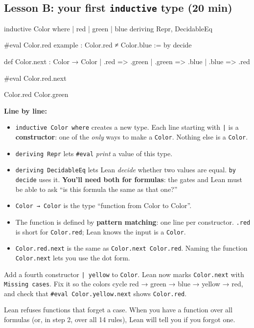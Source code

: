 \documentclass[11pt,a4paper]{article}
\newcommand{\code}[1]{\texttt{#1}}
\begin{document}
\subsection{Lesson B: your first \texttt{inductive} type (20 min)}
\begin{lean}
inductive Color where
  | red
  | green
  | blue
  deriving Repr, DecidableEq

#eval Color.red
example : Color.red ≠ Color.blue := by decide

def Color.next : Color → Color
  | .red   => .green
  | .green => .blue
  | .blue  => .red

#eval Color.red.next
\end{lean}
\begin{output}
Color.red
Color.green
\end{output}
\textbf{Line by line:}
\begin{itemize}
\item \code{inductive Color where} creates a new type. Each line starting with \code{|} is a \textbf{constructor}: one of the \emph{only} ways to make a \code{Color}. Nothing else is a \code{Color}.
\item \code{deriving Repr} lets \code{\#eval} \emph{print} a value of this type.
\item \code{deriving DecidableEq} lets Lean \emph{decide} whether two values are equal. \code{by decide} uses it. \textbf{You'll need both for formulas}: the gates and Lean must be able to ask ``is this formula the same as that one?''
\item \code{Color → Color} is the type ``function from Color to Color''.
\item The function is defined by \textbf{pattern matching}: one line per constructor. \code{.red} is short for \code{Color.red}; Lean knows the input is a \code{Color}.
\item \code{Color.red.next} is the same as \code{Color.next Color.red}. Naming the function \code{Color.next} lets you use the dot form.
\end{itemize}
\begin{try}
Add a fourth constructor \code{| yellow} to \code{Color}. Lean now marks \code{Color.next} with \code{Missing cases}. Fix it so the colors cycle red → green → blue → yellow → red, and check that \code{\#eval Color.yellow.next} shows \code{Color.red}.
\end{try}
\begin{tip}
Lean refuses functions that forget a case. When you have a function over all formulas (or, in step 2, over all 14 rules), Lean will tell you if you forgot one.
\end{tip}
\end{document}
